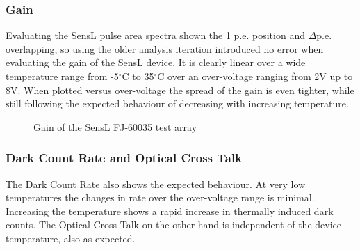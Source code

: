 \documentclass[12pt,article,type=msc,colorback,accentcolor=tud9c]{tudthesis}
\begin{document}
\begin{figure}[h]
\begin{centering}
}
\caption{SensL Test Array and pulse shape at bias-voltage = 29V0}
\label{fig:SensL_Array_PS}
\end{centering}
\end{figure}


\subsubsection{Gain}
\label{subsubsec:SensLGain}

Evaluating the SensL pulse area spectra shown the 1 p.e. position and $\Delta$p.e. overlapping, so using the older analysis iteration introduced no error when evaluating the gain of the SensL device. It is clearly linear over a wide temperature range from -5$^\circ$C to 35$^\circ$C over an over-voltage ranging from 2V up to 8V. When plotted versus over-voltage the spread of the gain is even tighter, while still following the expected behaviour of decreasing with increasing temperature.

\begin{figure}[h]
\begin{centering}
\caption{Gain of the SensL FJ-60035 test array}
\label{fig:SensL_Gain}
\end{centering}
\end{figure}

\newpage
\subsubsection{Dark Count Rate and Optical Cross Talk}
\label{subsubsec:SensLDCROCT}
The Dark Count Rate also shows the expected behaviour. At very low temperatures the changes in rate over the over-voltage range is minimal. Increasing the temperature shows a rapid increase in thermally induced dark counts. The Optical Cross Talk on the other hand is independent of the device temperature, also as expected. 
\end{document}
